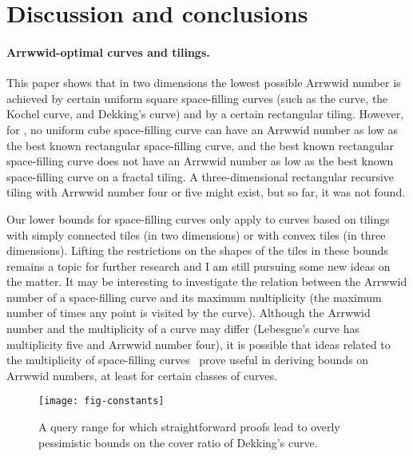 \documentclass[11pt,a4paper]{article}
\newcommand{\ARRWW}{\xspace}
\begin{document}
\section{Discussion and conclusions}\label{sec:conclusions}

\paragraph{Arrwwid-optimal curves and tilings.} This paper shows that in two dimensions the lowest possible Arrwwid number is achieved by certain uniform square space-filling curves (such as the \ARRWW curve, the Kochel curve, and Dekking's curve) and by a certain rectangular tiling. However, for , no uniform cube space-filling curve can have an Arrwwid number as low as the best known rectangular space-filling curve, and the best known rectangular space-filling curve does not have an Arrwwid number as low as the best known space-filling curve on a fractal tiling. A three-dimensional rectangular recursive tiling with Arrwwid number four or five might exist, but so far, it was not found.

Our lower bounds for space-filling curves only apply to curves based on tilings with simply connected tiles (in two dimensions) or with convex tiles (in three dimensions). Lifting the restrictions on the shapes of the tiles in these bounds remains a topic for further research and I am still pursuing some new ideas on the matter. It may be interesting to investigate the relation between the Arrwwid number of a space-filling curve and its maximum multiplicity (the maximum number of times any point is visited by the curve). Although the Arrwwid number and the multiplicity of a curve may differ (Lebesgue's curve has multiplicity five and Arrwwid number four), it is possible that ideas related to the multiplicity of space-filling curves~\cite{Mandelbrot1983} prove useful in deriving bounds on Arrwwid numbers, at least for certain classes of curves.

\begin{figure}
\centering
\texttt{[image: fig-constants]}
\caption{A query range for which straightforward proofs lead to overly pessimistic bounds on the cover ratio of Dekking's curve.}
\label{fig:constants}
\end{figure}
\end{document}
